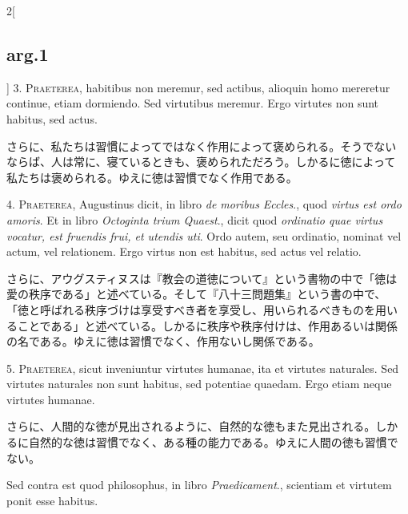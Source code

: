 \documentclass[paper=a4paper,fontsize=10pt,jafontsize=9pt,titlepage]{jlreq}
\begin{document}
\begin{paracol}{2}[\subsection{arg.1}]
3. {\scshape Praeterea}, habitibus non meremur, sed actibus, alioquin
homo mereretur continue, etiam dormiendo. Sed virtutibus meremur. Ergo
virtutes non sunt habitus, sed actus.

\switchcolumn

さらに、私たちは習慣によってではなく作用によって褒められる。そうでない
ならば、人は常に、寝ているときも、褒められただろう。しかるに徳によって
私たちは褒められる。ゆえに徳は習慣でなく作用である。


4. {\scshape Praeterea}, Augustinus dicit, in libro {\itshape de
moribus Eccles}., quod {\itshape virtus est ordo amoris}. Et in libro
{\itshape Octoginta trium Quaest}., dicit quod {\itshape ordinatio
quae virtus vocatur, est fruendis frui, et utendis uti}. Ordo autem,
seu ordinatio, nominat vel actum, vel relationem. Ergo virtus non est
habitus, sed actus vel relatio.

\switchcolumn

さらに、アウグスティヌスは『教会の道徳について』という書物の中で「徳は
愛の秩序である」と述べている。そして『八十三問題集』という書の中で、
「徳と呼ばれる秩序づけは享受すべき者を享受し、用いられるべきものを用い
ることである」と述べている。しかるに秩序や秩序付けは、作用あるいは関係
の名である。ゆえに徳は習慣でなく、作用ないし関係である。


5. {\scshape Praeterea}, sicut inveniuntur virtutes humanae, ita et
virtutes naturales. Sed virtutes naturales non sunt habitus, sed
potentiae quaedam. Ergo etiam neque virtutes humanae.

\switchcolumn

さらに、人間的な徳が見出されるように、自然的な徳もまた見出される。しか
るに自然的な徳は習慣でなく、ある種の能力である。ゆえに人間の徳も習慣で
ない。

\switchcolumn*[\subsection{s.c.}]

Sed contra est quod philosophus, in libro {\itshape Praedicament}.,
scientiam et virtutem ponit esse habitus.


\end{paracol}
\end{document}
